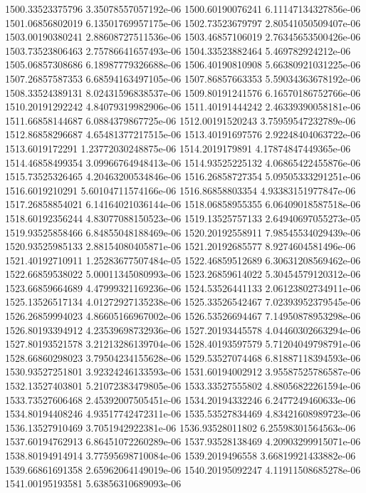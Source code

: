 {1500.33523375796 3.35078557057192e-06
1500.60190076241 6.11147134327856e-06
1501.06856802019 6.13501769957175e-06
1502.73523679797 2.80541050509407e-06
1503.00190380241 2.88608727511536e-06
1503.46857106019 2.76345653500426e-06
1503.73523806463 2.75786641657493e-06
1504.33523882464 5.469782924212e-06
1505.06857308686 6.18987779326688e-06
1506.40190810908 5.66380921031225e-06
1507.26857587353 6.68594163497105e-06
1507.86857663353 5.59034363678192e-06
1508.33524389131 8.02431596838537e-06
1509.80191241576 6.16570186752766e-06
1510.20191292242 4.84079319982906e-06
1511.40191444242 2.46339390058181e-06
1511.66858144687 6.0884379867725e-06
1512.00191520243 3.75959547232789e-06
1512.86858296687 4.65481377217515e-06
1513.40191697576 2.92248404063722e-06
1513.6019172291 1.23772030248875e-06
1514.2019179891 4.17874847449365e-06
1514.46858499354 3.09966764948413e-06
1514.93525225132 4.06865422455876e-06
1515.73525326465 4.20463200534846e-06
1516.26858727354 5.09505333291251e-06
1516.6019210291 5.60104711574166e-06
1516.86858803354 4.93383151977847e-06
1517.26858854021 6.14164021036144e-06
1518.06858955355 6.06409018587518e-06
1518.60192356244 4.83077088150523e-06
1519.13525757133 2.64940697055273e-05
1519.93525858466 6.84855048188469e-06
1520.20192558911 7.98545534029439e-06
1520.93525985133 2.88154080405871e-06
1521.20192685577 8.9274604581496e-06
1521.40192710911 1.25283677507484e-05
1522.46859512689 6.30631208569462e-06
1522.66859538022 5.00011345080993e-06
1523.26859614022 5.30454579120312e-06
1523.66859664689 4.47999321169236e-06
1524.53526441133 2.06123802734911e-06
1525.13526517134 4.01272927135238e-06
1525.33526542467 7.02393952379545e-06
1526.26859994023 4.86605166967002e-06
1526.53526694467 7.14950878953298e-06
1526.80193394912 4.23539698732936e-06
1527.20193445578 4.04460302663294e-06
1527.80193521578 3.21213286139704e-06
1528.40193597579 5.71204049798791e-06
1528.66860298023 3.79504234155628e-06
1529.53527074468 6.81887118394593e-06
1530.93527251801 3.92324246133593e-06
1531.60194002912 3.95587525786587e-06
1532.13527403801 5.21072383479805e-06
1533.33527555802 4.88056822261594e-06
1533.73527606468 2.45392007505451e-06
1534.20194332246 6.2477249460633e-06
1534.80194408246 4.93517742472311e-06
1535.53527834469 4.83421608989723e-06
1536.13527910469 3.7051942922381e-06
1536.93528011802 6.25598301564563e-06
1537.60194762913 6.86451072260289e-06
1537.93528138469 4.20903299915071e-06
1538.80194914914 3.77595698710084e-06
1539.2019496558 3.66819921433882e-06
1539.66861691358 2.65962064149019e-06
1540.20195092247 4.11911508685278e-06
1541.00195193581 5.63856310689093e-06
}
